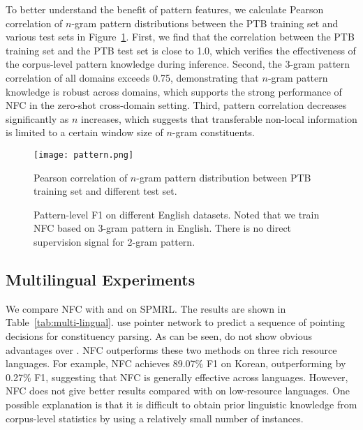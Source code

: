 \documentclass[11pt]{article}
\begin{document}
To better understand the benefit of pattern features, we calculate Pearson correlation of $n$-gram pattern distributions between the PTB training set and various test sets in Figure~\ref{fig:correlation}.
First, we find that the correlation between the PTB training set and the PTB test set is close to 1.0, which verifies the effectiveness of the corpus-level pattern knowledge during inference. 
Second, the $3$-gram pattern correlation of all domains exceeds 0.75, demonstrating that $n$-gram pattern knowledge is robust across domains, which supports the strong performance of NFC in the zero-shot cross-domain setting. 
Third, pattern correlation decreases significantly as $n$ increases, which suggests that transferable non-local information is limited to a certain window size of $n$-gram constituents. 




\begin{figure}[t!]
    \centering
    \texttt{[image: pattern.png]}
    \caption{Pearson correlation of $n$-gram pattern distribution between PTB training set and different test set.}
    \label{fig:correlation}
\end{figure}

\begin{figure}[t!]
    \centering
    \caption{Pattern-level F1 on different English datasets. Noted that we train NFC based on 3-gram pattern in English. There is no direct supervision signal for 2-gram pattern.}
    \label{fig:pattern}
\end{figure}






\subsection{Multilingual Experiments}
We compare NFC with \citet{san-constituency} and \citet{constituency-point} on SPMRL. 
The results are shown in Table~\ref{tab:multi-lingual}. 
\citet{constituency-point} use pointer network to predict a sequence of pointing decisions for constituency parsing. As can be seen, \citet{constituency-point} do not show obvious advantages over \citet{san-constituency}.
NFC outperforms these two methods on three rich resource languages. 
For example, NFC achieves 89.07\% F1 on Korean, outperforming \citet{san-constituency} by 0.27\% F1, suggesting that NFC is generally effective across languages. However, NFC does not give better results compared with \citet{san-constituency} on low-resource languages. 
One possible explanation is that it is difficult to obtain prior linguistic knowledge from corpus-level statistics by using a relatively small number of instances.
\end{document}
